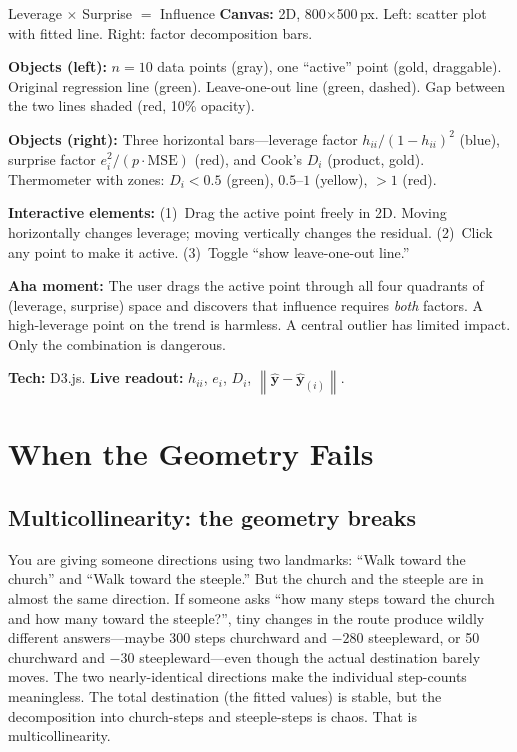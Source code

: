 \documentclass[11pt,a4paper]{article}
\theoremstyle{plain}
\theoremstyle{definition}
\newcommand{\yhat}{\hat{\bm{y}}}
\newcommand{\norm}[1]{\left\lVert #1 \right\rVert}
\begin{document}
\begin{vizspec}{Leverage $\times$ Surprise $=$ Influence}
\textbf{Canvas:} 2D, 800$\times$500\,px.  Left: scatter plot with
fitted line.  Right: factor decomposition bars.

\textbf{Objects (left):} $n = 10$ data points (\textcolor{secondary}{gray}),
one ``active'' point (\textcolor{response}{gold}, draggable).
Original regression line (\textcolor{projection}{green}).
Leave-one-out line (\textcolor{projection}{green}, dashed).
Gap between the two lines shaded (\textcolor{residual}{red}, 10\% opacity).

\textbf{Objects (right):} Three horizontal bars---leverage factor
$h_{ii}/(1-h_{ii})^2$ (\textcolor{colspace}{blue}), surprise factor
$e_i^2/(p\cdot\text{MSE})$ (\textcolor{residual}{red}), and Cook's
$D_i$ (product, \textcolor{response}{gold}).  Thermometer with zones:
$D_i<0.5$ (green), $0.5$--$1$ (yellow), $>1$ (red).

\textbf{Interactive elements:}
(1)~Drag the active point freely in 2D.  Moving horizontally changes
leverage; moving vertically changes the residual.
(2)~Click any point to make it active.
(3)~Toggle ``show leave-one-out line.''

\textbf{Aha moment:} The user drags the active point through all four
quadrants of (leverage, surprise) space and discovers that influence
requires \emph{both} factors.  A high-leverage point on the trend is
harmless.  A central outlier has limited impact.  Only the combination
is dangerous.

\textbf{Tech:} D3.js.
\quad \textbf{Live readout:} $h_{ii}$, $e_i$, $D_i$,
$\norm{\yhat - \yhat_{(i)}}$.
\end{vizspec}


\section{When the Geometry Fails}\label{sec:failures}

\subsection{Multicollinearity: the geometry breaks}\label{sec:multicollinearity}

\begin{toystory}
You are giving someone directions using two landmarks: ``Walk toward
the church'' and ``Walk toward the steeple.''  But the church and the
steeple are in almost the same direction.  If someone asks ``how many
steps toward the church and how many toward the steeple?'', tiny
changes in the route produce wildly different answers---maybe 300 steps
churchward and $-280$ steepleward, or 50 churchward and $-30$
steepleward---even though the actual destination barely moves.  The two
nearly-identical directions make the individual step-counts meaningless.
The total destination (the fitted values) is stable, but the
decomposition into church-steps and steeple-steps is chaos.  That is
multicollinearity.
\end{toystory}
\end{document}

